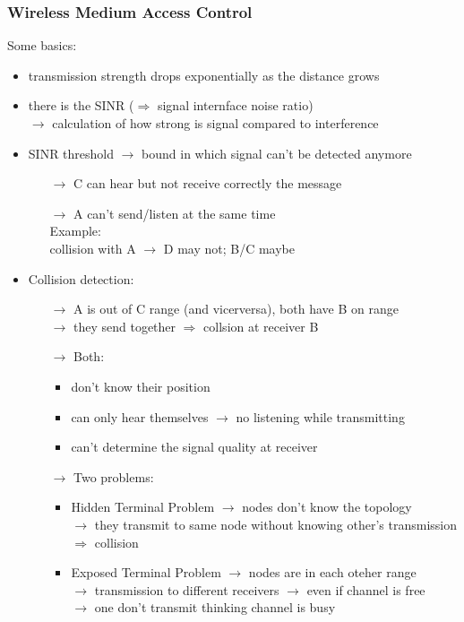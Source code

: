 \subsubsection{Wireless Medium Access Control}
Some basics:
\begin{itemize}
    \item transmission strength drops exponentially as the distance grows
    \item there is the SINR ($\Rightarrow$ signal internface noise ratio)\\
    $\rightarrow$ calculation of how strong is signal compared to interference
    \item SINR threshold $\rightarrow$ bound in which signal can't be detected anymore
    \begin{itemize}
        \item[$\rightarrow$] C can hear but not receive correctly the message
        \item[$\rightarrow$] A can't send/listen at the same time\\
        Example:\\
        collision with A $\rightarrow$ D may not; B/C maybe
    \end{itemize}
    \item Collision detection:
    \begin{itemize}
        \item[$\rightarrow$] A is out of C range (and vicerversa), both have B on range\\
        $\rightarrow$ they send together $\Rightarrow$ collsion at receiver B
        \item[$\rightarrow$] Both:
        \begin{itemize}
            \item don't know their position
            \item can only hear themselves $\rightarrow$ no listening while transmitting
            \item can't determine the signal quality at receiver
        \end{itemize}
        \item[$\rightarrow$] Two problems:
        \begin{itemize}
            \item Hidden Terminal Problem $\rightarrow$ nodes don't know the topology\\
            $\rightarrow$ they transmit to same node without knowing other's transmission\\
            $\Rightarrow$ collision
            \item Exposed Terminal Problem $\rightarrow$ nodes are in each oteher range\\
            $\rightarrow$ transmission to different receivers $\rightarrow$ even if channel is free\\
            $\rightarrow$ one don't transmit thinking channel is busy
        \end{itemize}
    \end{itemize}
    
\end{itemize}













